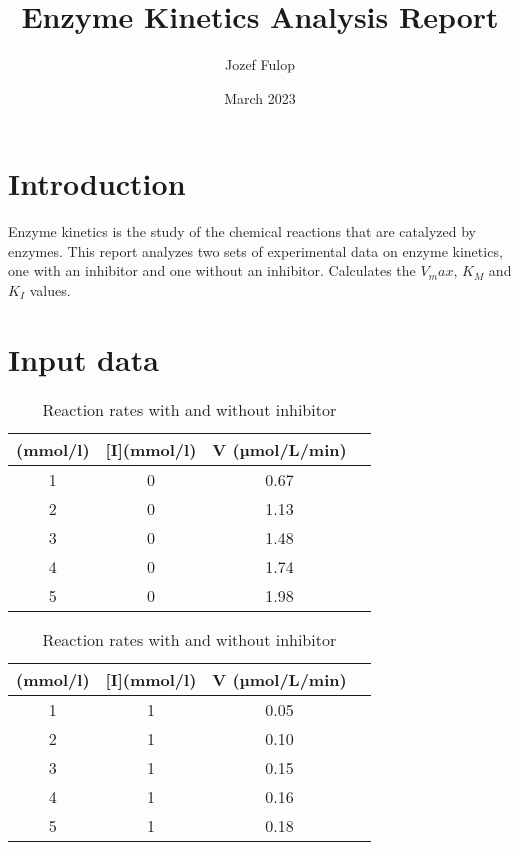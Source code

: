 \documentclass{article}
\title{Enzyme Kinetics Analysis Report}
\author{Jozef Fulop}
\date{March 2023}
\begin{document}
\maketitle

\section{Introduction}
Enzyme kinetics is the study of the chemical 
reactions that are catalyzed by enzymes. 
This report analyzes two sets of experimental data on enzyme kinetics, 
one with an inhibitor and one without an inhibitor. 
Calculates the $V_max$, $K_M$ and $K_I$ values.

\section{Input data}

\begin{table}[htbp]
\centering
\begin{subtable}{\textwidth}
\centering
\caption{Reaction without inhibitor}
\begin{tabular}{cccc}
\hline
[S](mmol/l) & [I](mmol/l) & V (µmol/L/min) \\
\hline
1 & 0 & 0.67 \\
2 & 0 & 1.13 \\
3 & 0 & 1.48 \\
4 & 0 & 1.74 \\
5 & 0 & 1.98 \\
\hline
\end{tabular}
\end{subtable}
\begin{subtable}{\textwidth}
\centering
\caption{Reaction with inhibitor}
\begin{tabular}{cccc}
\hline
[S](mmol/l) & [I](mmol/l) & V (µmol/L/min) \\
\hline
1 & 1 & 0.05 \\
2 & 1 & 0.10 \\
3 & 1 & 0.15 \\
4 & 1 & 0.16 \\
5 & 1 & 0.18 \\
\hline
\end{tabular}
\end{subtable}
\caption{Reaction rates with and without inhibitor}
\end{table}
\end{document}
